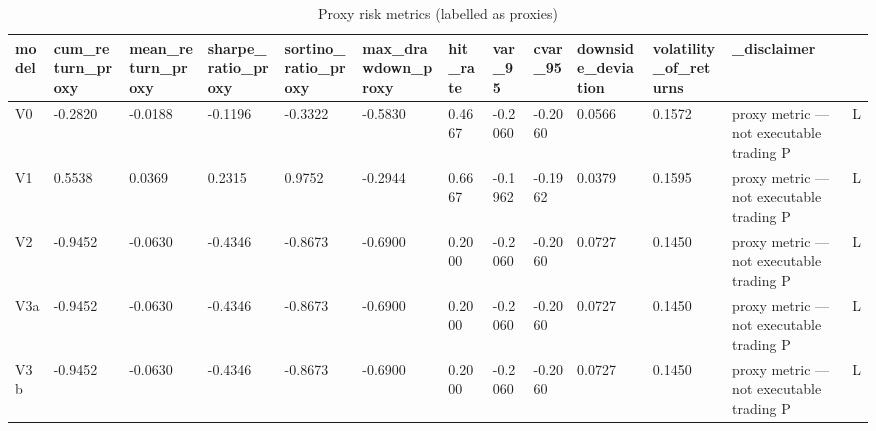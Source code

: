 \begin{table}[htbp]
\centering
\begin{tabular}{llllllllllll}
\hline
model & cum_return_proxy & mean_return_proxy & sharpe_ratio_proxy & sortino_ratio_proxy & max_drawdown_proxy & hit_rate & var_95 & cvar_95 & downside_deviation & volatility_of_returns & _disclaimer \\
\hline
V0 & -0.2820 & -0.0188 & -0.1196 & -0.3322 & -0.5830 & 0.4667 & -0.2060 & -0.2060 & 0.0566 & 0.1572 & proxy metric — not executable trading P&L \\
V1 & 0.5538 & 0.0369 & 0.2315 & 0.9752 & -0.2944 & 0.6667 & -0.1962 & -0.1962 & 0.0379 & 0.1595 & proxy metric — not executable trading P&L \\
V2 & -0.9452 & -0.0630 & -0.4346 & -0.8673 & -0.6900 & 0.2000 & -0.2060 & -0.2060 & 0.0727 & 0.1450 & proxy metric — not executable trading P&L \\
V3a & -0.9452 & -0.0630 & -0.4346 & -0.8673 & -0.6900 & 0.2000 & -0.2060 & -0.2060 & 0.0727 & 0.1450 & proxy metric — not executable trading P&L \\
V3b & -0.9452 & -0.0630 & -0.4346 & -0.8673 & -0.6900 & 0.2000 & -0.2060 & -0.2060 & 0.0727 & 0.1450 & proxy metric — not executable trading P&L \\
\hline
\end{tabular}
\caption{Proxy risk metrics (labelled as proxies)}
\label{table_risk_adjusted_evaluation}
\end{table}